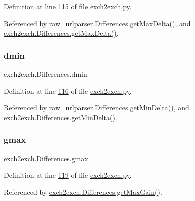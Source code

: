 Definition at line \hyperlink{exch2exch_8py_source_l00115}{115} of file \hyperlink{exch2exch_8py_source}{exch2exch.\+py}.



Referenced by \hyperlink{raw__urlparser_8py_source_l00097}{raw\+\_\+urlparser.\+Differences.\+get\+Max\+Delta()}, and \hyperlink{exch2exch_8py_source_l00130}{exch2exch.\+Differences.\+get\+Max\+Delta()}.

\mbox{\label{classexch2exch_1_1_differences_a7825bfca16b5775aa770c8810412b215}} 
\subsubsection{\texorpdfstring{dmin}{dmin}}
{\footnotesize\ttfamily exch2exch.\+Differences.\+dmin}



Definition at line \hyperlink{exch2exch_8py_source_l00116}{116} of file \hyperlink{exch2exch_8py_source}{exch2exch.\+py}.



Referenced by \hyperlink{raw__urlparser_8py_source_l00094}{raw\+\_\+urlparser.\+Differences.\+get\+Min\+Delta()}, and \hyperlink{exch2exch_8py_source_l00127}{exch2exch.\+Differences.\+get\+Min\+Delta()}.

\mbox{\label{classexch2exch_1_1_differences_a569f2a6fa0e33ad725c3c3ada259ddcc}} 
\subsubsection{\texorpdfstring{gmax}{gmax}}
{\footnotesize\ttfamily exch2exch.\+Differences.\+gmax}



Definition at line \hyperlink{exch2exch_8py_source_l00119}{119} of file \hyperlink{exch2exch_8py_source}{exch2exch.\+py}.



Referenced by \hyperlink{exch2exch_8py_source_l00136}{exch2exch.\+Differences.\+get\+Max\+Gain()}.

\mbox{\label{classexch2exch_1_1_differences_a33c9add531b5b46c49ae322657343382}} 
